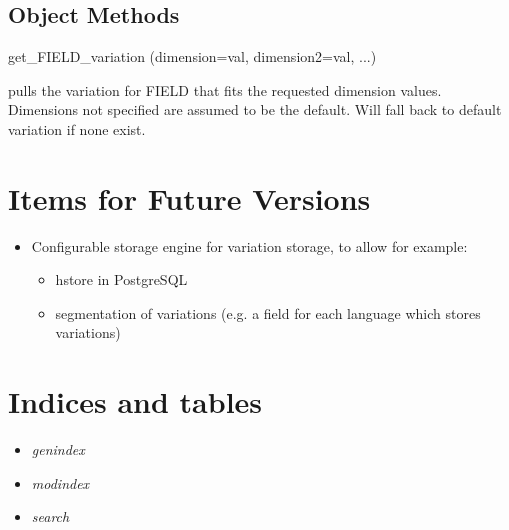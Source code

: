 \documentclass[letterpaper,10pt,english]{sphinxmanual}
\begin{document}
\section{Object Methods}
\label{reference/object_methods::doc}\label{reference/object_methods:object-methods}
get\_FIELD\_variation (dimension=val, dimension2=val, ...)

pulls the variation for FIELD that fits the requested dimension values. Dimensions not specified are assumed to be the default. Will fall back to default variation if none exist.


\chapter{Items for Future Versions}
\label{future_versions::doc}\label{future_versions:items-for-future-versions}\begin{itemize}
\item {} 
Configurable storage engine for variation storage, to allow for example:
\begin{itemize}
\item {} 
hstore in PostgreSQL

\item {} 
segmentation of variations (e.g. a field for each language which stores variations)

\end{itemize}

\end{itemize}


\chapter{Indices and tables}
\label{index:indices-and-tables}\begin{itemize}
\item {} 
\emph{genindex}

\item {} 
\emph{modindex}

\item {} 
\emph{search}

\end{itemize}



\renewcommand{\indexname}{Index}
\printindex
\end{document}
